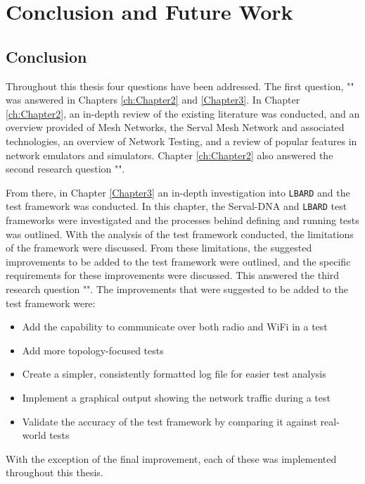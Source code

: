 
\chapter{Conclusion and Future Work} %

\label{Chapter8}

\section{Conclusion}
Throughout this thesis four questions have been addressed.
The first question, "\firstRQ" was answered in Chapters \ref{ch:Chapter2} and \ref{Chapter3}.
In Chapter \ref{ch:Chapter2}, an in-depth review of the existing literature was conducted, and an overview provided of Mesh Networks, the Serval Mesh Network and associated technologies, an overview of Network Testing, and a review of popular features in network emulators and simulators.
Chapter \ref{ch:Chapter2} also answered the second research question "\secondRQ".

From there, in Chapter \ref{Chapter3} an in-depth investigation into \texttt{LBARD} and the test framework was conducted.
In this chapter, the Serval-DNA and \texttt{LBARD} test frameworks were investigated and the processes behind defining and running tests was outlined. 
With the analysis of the test framework conducted, the limitations of the framework were discussed.
From these limitations, the suggested improvements to be added to the test framework were outlined, and the specific requirements for these improvements were discussed.
This answered the third research question "\thirdRQ".
The improvements that were suggested to be added to the test framework were:
\begin{itemize}
    \item Add the capability to communicate over both radio and WiFi in a test
    \item Add more topology-focused tests
    \item Create a simpler, consistently formatted log file for easier test analysis
    \item Implement a graphical output showing the network traffic during a test
    \item Validate the accuracy of the test framework by comparing it against real-world tests
\end{itemize}
With the exception of the final improvement, each of these was implemented throughout this thesis.

